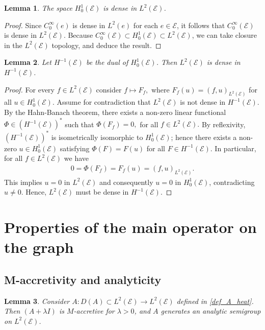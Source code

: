 \documentclass[a4paper, 10pt, english]{article}
\def\to{\rightarrow}
\newtheorem{lemma}{Lemma}[section]
\begin{document}
\begin{lemma}\label{lemma:dense_H1L2}
The space $H_0^1(\mathcal{E})$ is dense in $L^2(\mathcal{E})$.
\end{lemma}

\begin{proof}
Since $C_0^\infty(e)$ is dense in $L^2(e)$ for each $e \in \mathcal{E}$, it follows that $C_0^\infty(\mathcal{E})$ is dense in $L^2(\mathcal{E})$. Because $C_0^\infty(\mathcal{E}) \subset H_0^1(\mathcal{E}) \subset L^2(\mathcal{E})$, we can take closure in the $L^2(\mathcal{E})$ topology, and deduce the result.
\end{proof}
\begin{lemma}\label{lemma:dense_L2H-1}
Let $H^{-1}(\mathcal{E})$ be the dual of $H_0^1(\mathcal{E})$. Then $L^2(\mathcal{E})$ is dense in $H^{-1}(\mathcal{E})$.
\end{lemma}

\begin{proof}
For every $f\in L^2(\mathcal{E})$ consider $f \mapsto F_f,$ where $F_f(u) = (f, u)_{L^2(\mathcal{E})}$ for all $u \in H_0^1(\mathcal{E}).$ Assume for contradiction that $ L^2(\mathcal{E}) $ is not dense in $ H^{-1}(\mathcal{E}) $. By the Hahn-Banach theorem, there exists a non-zero linear functional $ \Phi \in (H^{-1}(\mathcal{E}))^*$ such that $\Phi(F_f) = 0,$ for all $f \in L^2(\mathcal{E}).$ By reflexivity, $(H^{-1}(\mathcal{E}))^*$ is isometrically isomorphic to $ H_0^1(\mathcal{E})$; hence there exists a non-zero $u\in H_0^1(\mathcal{E})$ satisfying $\Phi(F) = F(u)$ for all $F \in H^{-1}(\mathcal{E}).$ In particular, for all $ f \in L^2(\mathcal{E}) $ we have
\begin{align*}
    0 = \Phi(F_f) = F_f(u) = (f, u)_{L^2(\mathcal{E})}.
\end{align*}
This implies $u =0 $ in $ L^2(\mathcal{E})$ and consequently $u =0 $ in $ H_0^1(\mathcal{E})$, contradicting $u \neq 0$. Hence, $L^2(\mathcal{E})$ must be dense in $H^{-1}(\mathcal{E}) $.
\end{proof}

 



 \section{Properties of the main operator on the graph}\label{appendix3}



\subsection{M-accretivity  and analyticity}
\begin{lemma}\label{prop:A_deg_generator}
Consider
$A : D(A) \subset L^2(\mathcal{E}) \to L^2(\mathcal{E})$ defined in \eqref{def_A_heat}. Then $(A+\lambda I)$ is $M$-accretive for $\lambda>0$, and $A$ generates an analytic semigroup 
on $L^2(\mathcal{E})$.
\end{lemma}
\end{document}
